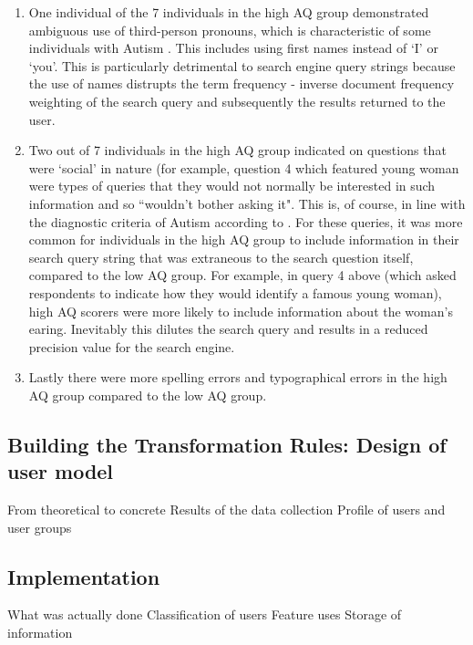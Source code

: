 \documentclass[a4paper, 11pt]{article}
\begin{document}
\begin{enumerate}
\item{One individual of the 7 individuals in the high AQ group demonstrated ambiguous use of third-person pronouns, which is characteristic of some individuals with Autism \cite{pronoun}. This includes using first names instead of `I' or `you'. This is particularly detrimental to search engine query strings because the use of names distrupts the term frequency - inverse document frequency weighting \cite{tfidf} of the search query and subsequently the results returned to the user.
}
 
\item{
Two out of 7 individuals in the high AQ group indicated on questions that were `social' in nature (for example, question 4 which featured young woman were types of queries that they would not normally be interested in such information and so ``wouldn't bother asking it". This is, of course, in line with the diagnostic criteria of Autism according to \cite{DSM}. For these queries, it was more common for individuals in the high AQ group to include information in their search query string that was extraneous to the search question itself, compared to the low AQ group. For example, in query 4 above (which asked respondents to indicate how they would identify a famous young woman), high AQ scorers were more likely to include information about the woman's earing. Inevitably this dilutes the search query and results in a reduced precision value for the search engine.
}

\item{ 
Lastly there were more spelling errors and typographical errors in the high AQ group compared to the low AQ group.
}

\end{enumerate}
\subsection{Building the Transformation Rules: Design of user model}
From theoretical to concrete
Results of the data collection
Profile of users and user groups

\subsection{Implementation}
What was actually done
Classification of users
Feature uses
Storage of information
\end{document}
